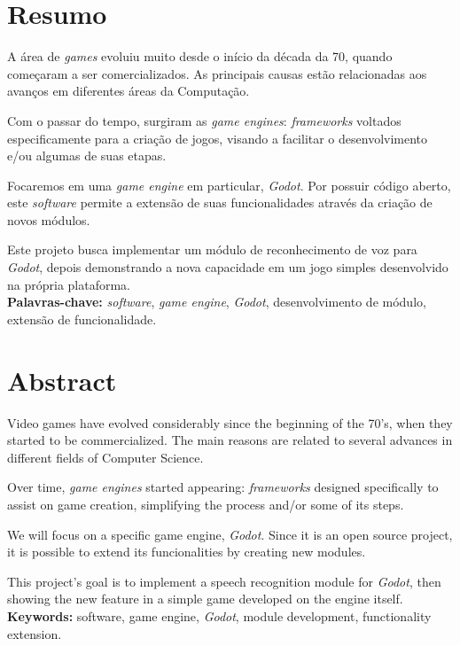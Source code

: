 
\chapter*{Resumo}

A área de \emph{games} evoluiu muito desde o início da década da 70, quando começaram
a ser comercializados. As principais causas estão relacionadas aos avanços em
diferentes áreas da Computação.

Com o passar do tempo, surgiram as \emph{game engines}: \emph{frameworks} voltados
especificamente para a criação de jogos, visando a facilitar o desenvolvimento e/ou
algumas de suas etapas.

Focaremos em uma \emph{game engine} em particular, \emph{Godot}. Por possuir código
aberto, este \emph{software} permite a extensão de suas funcionalidades através da
criação de novos módulos.

Este projeto busca implementar um módulo de reconhecimento de voz para \emph{Godot},
depois demonstrando a nova capacidade em um jogo simples desenvolvido na própria
plataforma.
\\

\noindent \textbf{Palavras-chave:} \emph{software}, \emph{game engine}, \emph{Godot},
desenvolvimento de módulo, extensão de funcionalidade.


\chapter*{Abstract}

Video games have evolved considerably since the beginning of the 70's, when they
started to be commercialized. The main reasons are related to several advances in
different fields of Computer Science.

Over time, \emph{game engines} started appearing: \emph{frameworks} designed
specifically to assist on game creation, simplifying the process and/or some of its
steps.

We will focus on a specific game engine, \emph{Godot}. Since it is an open source
project, it is possible to extend its funcionalities by creating new modules.

This project's goal is to implement a speech recognition module for \emph{Godot},
then showing the new feature in a simple game developed on the engine itself.
\\

\noindent \textbf{Keywords:} software, game engine, \emph{Godot}, module development,
functionality extension.
